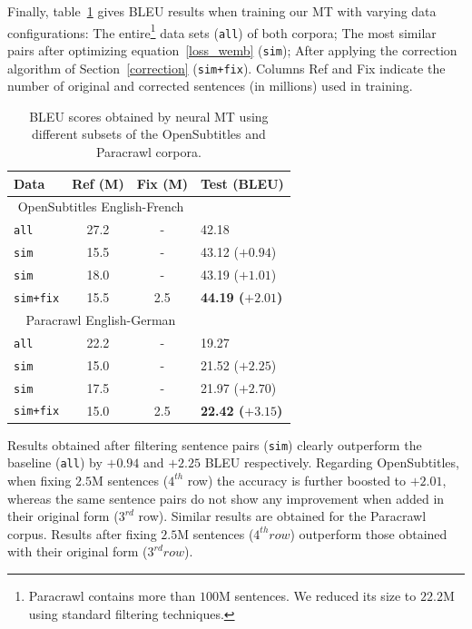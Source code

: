 \documentclass[11pt,a4paper]{article}
\begin{document}
Finally, table~\ref{results} gives BLEU results when training our MT with varying data configurations:
The entire\footnote{Paracrawl contains more than $100$M sentences. We reduced its size to $22.2$M using standard filtering techniques.} data sets (\texttt{all}) of both corpora; 
The most similar pairs after optimizing equation~\eqref{loss_wemb} (\texttt{sim}); 
After applying the correction algorithm of Section~\ref{correction} (\texttt{sim+fix}).
Columns Ref and Fix indicate the number of original and corrected sentences (in millions) used in training.

\begin{table}[h!]
\small
\center
\begin{tabular}{lccl}
\hline
\bf Data & \bf Ref (M) & \bf Fix (M) & \bf Test (BLEU) \\ %
\hline
\multicolumn{3}{c}{\scriptsize{OpenSubtitles English-French}} \\
\texttt{all}                   & 27.2 & - & 42.18 \\
\texttt{sim}            & 15.5 & - & 43.12  ($+0.94$)\\
\texttt{sim}           & 18.0 & - & 43.19  ($+1.01$)\\
\texttt{sim+fix}     & 15.5 & 2.5 & \bf 44.19 ($+2.01$)\\
\hline
\multicolumn{3}{c}{\scriptsize{Paracrawl English-German}} \\
\texttt{all}                  & 22.2 & - & 19.27 \\ 
\texttt{sim}           & 15.0 & - & 21.52 ($+2.25$)\\
\texttt{sim}           & 17.5 & - & 21.97 ($+2.70$)\\
\texttt{sim+fix}   & 15.0 & 2.5 & \bf 22.42 ($+3.15$) \\
\hline
\end{tabular}
\caption{BLEU scores obtained by neural MT using different subsets of the OpenSubtitles and Paracrawl corpora.}
\label{results}
\end{table}

Results obtained after filtering sentence pairs (\texttt{sim}) clearly outperform the baseline (\texttt{all}) by $+0.94$ and $+2.25$ BLEU respectively.
Regarding OpenSubtitles, when fixing $2.5$M sentences ($4^{th}$ row) the accuracy is further boosted to $+2.01$, whereas the same sentence pairs do not show any improvement when added in their original form ($3^{rd}$ row).
Similar results are obtained for the Paracrawl corpus. Results after fixing $2.5$M sentences ($4^{th} row$) outperform those obtained with their original form ($3^{rd} row$).
\end{document}

